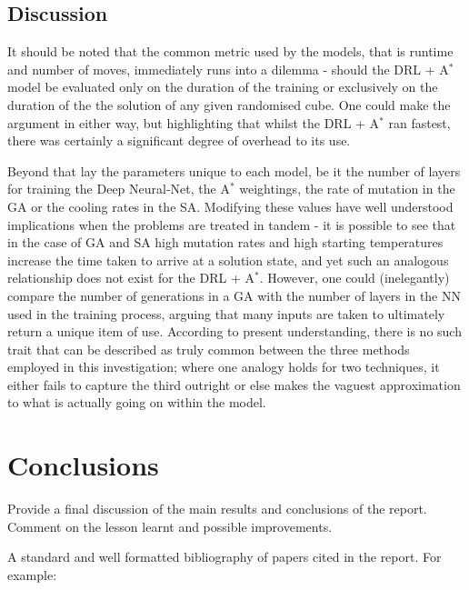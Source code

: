 \documentclass[UKenglish]{svproc}
\begin{document}
\subsection{Discussion}
It should be noted that the common metric used by the models, that is runtime and number of moves, immediately runs into a dilemma - should the DRL + A$^{\ast}$ model be evaluated only on the duration of the training or exclusively on the duration of the the solution of any given randomised cube. One could make the argument in either way, but highlighting that whilst the DRL + A$^{\ast}$ ran fastest, there was certainly a significant degree of overhead to its use. \par Beyond that lay the parameters unique to each model, be it the number of layers for training the Deep Neural-Net, the A$^{\ast}$ weightings, the rate of mutation in the GA or the cooling rates in the SA. Modifying these values have well understood implications when the problems are treated in tandem - it is possible to see that in the case of GA and SA high mutation rates and high starting temperatures increase the time taken to arrive at a solution state, and yet such an analogous relationship does not exist for the DRL + A$^{\ast}$. However, one could (inelegantly) compare the number of generations in a GA with the number of layers in the NN used in the training process, arguing that many inputs are taken to ultimately return a unique item of use. According to present understanding, there is no such trait that can be described as truly common between the three methods employed in this investigation; where one analogy holds for two techniques, it either fails to capture the third outright or else makes the vaguest approximation to what is actually going on within the model. 

\section{Conclusions}
Provide a final discussion of the main results and conclusions of the report. Comment on the lesson learnt and possible improvements.


A standard and well formatted bibliography of papers cited in the report. For example:

\printbibliography
\end{document}

